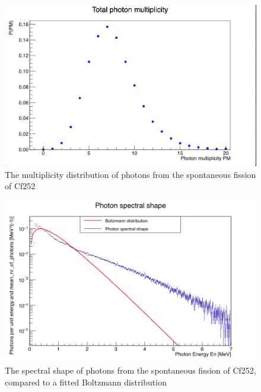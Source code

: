 \documentclass[]{article}
\begin{document}
\begin{figure} [H]
	\centering
	\includegraphics[scale=0.36]{Cf252_sf_total_ph_mult.png}
	\caption{The multiplicity distribution of photons from the spontaneous fission of Cf252}
	\label{fig:Cf252_sf_total_ph_mult}
\end{figure}

\begin{figure} [H]
	\centering
	\includegraphics[scale=0.36]{Cf252_sf_photons_spectral_shape.png}
	\caption{The spectral shape of photons from the spontaneous fission of Cf252, compared to a fitted Boltzmann distribution}
	\label{fig:Cf252_sf_photons_spectral_shape}
\end{figure}
	
\end{document}
